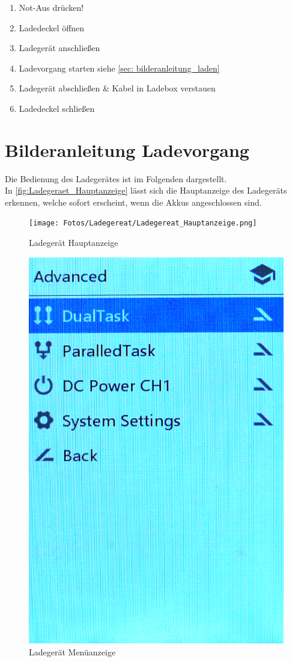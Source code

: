 \begin{enumerate}
    \item Not-Aus drücken!
    \item Ladedeckel öffnen
    \item Ladegerät anschließen
    \item Ladevorgang starten siehe \ref{sec: bilderanleitung_laden}
    \item Ladegerät abschließen \& Kabel in Ladebox verstauen
    \item Ladedeckel schließen
\end{enumerate}

\newpage
\section{Bilderanleitung Ladevorgang \label{sec: bilderanleitung_laden}}
Die Bedienung des Ladegerätes ist im Folgenden dargestellt. \\

In \autoref{fig:Ladegeraet_Hauptanzeige} lässt sich die Hauptanzeige des Ladegeräts erkennen, welche 
sofort erscheint, wenn die Akkus angeschlossen sind. 


\begin{figure}[H]
    \centering
    \texttt{[image: Fotos/Ladegereat/Ladegereat\_Hauptanzeige.png]}
    \caption{Ladegerät Hauptanzeige \label{fig:Ladegeraet_Hauptanzeige}}
\end{figure}

\begin{figure}[H]
    \centering
    \includegraphics[width=.35\textwidth]{Fotos/Ladegereat/DSC_8744_Lademenue.png}
    \caption{Ladegerät Menüanzeige}
\end{figure}

